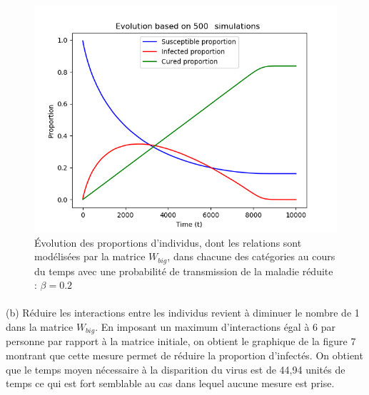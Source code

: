 \documentclass[a4paper, 12pt, oneside]{article}
\begin{document}
\begin{figure}[H]
	\centering
	\includegraphics[scale=1]{Wbig_dense_reduction_transmission.png} 
	\caption{Évolution des proportions d'individus, dont les relations sont modélisées par la matrice $W_{big}$, dans chacune des catégories au cours du temps avec une probabilité de transmission de la maladie réduite : $\beta = 0.2$}
\end{figure}


\paragraph{}(b) Réduire les interactions entre les individus revient à diminuer le nombre de 1 dans la matrice $W_{big}$. En imposant un maximum d'interactions égal à 6 par personne par rapport à la matrice initiale, on obtient le graphique de la figure 7 montrant que cette mesure permet de réduire la proportion d'infectés. On obtient que le temps moyen nécessaire à la disparition du virus est de 44,94 unités de temps ce qui est fort semblable au cas dans lequel aucune mesure est prise.
\end{document}

